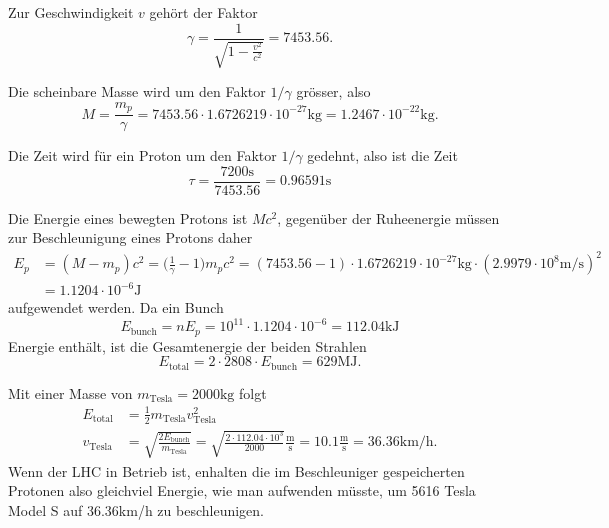 \begin{loesung}
Zur Geschwindigkeit  $v$ gehört der Faktor
\[
\gamma
=
\frac1{\displaystyle\sqrt{1-\frac{v^2}{c^2}}}
=
7453.56.
\]
\begin{teilaufgaben}
\item Die scheinbare Masse wird um den Faktor $1/\gamma$ grösser, also
\[
M
=
\frac{m_p}{\gamma}
=
7453.56
\cdot
1.6726219\cdot 10^{-27}\text{kg}
=
1.2467\cdot 10^{-22}\text{kg}.
\]
\item Die Zeit wird für ein Proton um den Faktor $1/\gamma$ gedehnt,
also ist die Zeit 
\[
\tau = \frac{7200\text{s}}{7453.56}=0.96591\text{s}
\]
\item 
Die Energie eines bewegten Protons ist $Mc^2$, gegenüber der
Ruheenergie müssen zur Beschleunigung eines Protons daher
\begin{align*}
E_p
&=
(M-m_p)c^2 
=
\biggl(\frac{1}{\gamma}-1\biggr)m_pc^2
=
(7453.56-1)\cdot
1.6726219\cdot 10^{-27}\text{kg}
\cdot
(2.9979\cdot 10^{8}\text{m/s})^2
\\
&=
1.1204\cdot 10^{-6}\text{J}
\end{align*}
aufgewendet werden.
Da ein Bunch 
\[
E_{\text{bunch}}
=
nE_p
=
10^{11}\cdot1.1204\cdot 10^{-6}
=
112.04\text{kJ}
\]
Energie enthält, ist die Gesamtenergie der beiden Strahlen
\[
E_{\text{total}}
=
2\cdot 2808\cdot E_{\text{bunch}}
=
629\text{MJ}.
\]
\item
Mit einer Masse von $m_{\text{Tesla}}=2000\text{kg}$ folgt
\begin{align*}
E_{\text{total}}
&=
\frac12m_{\text{Tesla}}v_{\text{Tesla}}^2
\\
v_{\text{Tesla}}
&=\sqrt{
\frac{2E_{\text{bunch}}}{m_{\text{Tesla}}}
}
=
\sqrt{\frac{2\cdot 112.04\cdot 10^3}{2000}}\frac{\text{m}}{\text{s}}
=
10.1\frac{\text{m}}{\text{s}}=36.36\text{km/h}.
\end{align*}
Wenn der LHC in Betrieb ist, enhalten die im Beschleuniger
gespeicherten Protonen also gleichviel Energie, wie man aufwenden müsste,
um 5616 Tesla Model S auf 36.36km/h zu beschleunigen.
\qedhere
\end{teilaufgaben}
\end{loesung}





